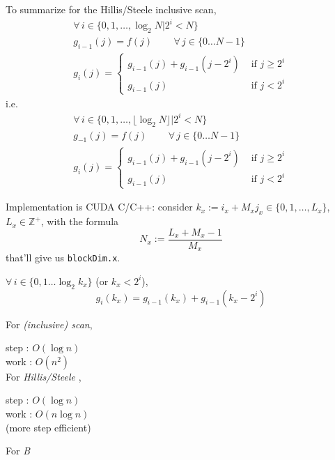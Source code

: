 \documentclass[10pt]{amsart}
\begin{document}
\begin{multicols*}{2}
To summarize for the Hillis/Steele inclusive scan,
\begin{equation}
  \boxed{ \begin{gathered}
      \forall \, i \in \lbrace 0 ,1 , \dots , \log_2{N} | 2^i < N \rbrace \\ 
      g_{i-1}(j) = f(j) \qquad \, \forall \, j \in \lbrace 0 \dots N-1 \rbrace \\
      g_i(j) = \begin{cases}
        g_{i-1}(j) + g_{i-1}(j-2^i) & \text{ if } j \geq 2^i \\
        g_{i-1}(j) & \text{ if } j < 2^i \end{cases}
      \end{gathered}
  }
  \end{equation}
i.e.
\begin{equation}
  \boxed{ \begin{gathered}
      \forall \, i \in \lbrace 0 ,1 , \dots , \lfloor \log_2{N} \rfloor | 2^i < N \rbrace \\ 
      g_{-1}(j) = f(j) \qquad \, \forall \, j \in \lbrace 0 \dots N-1 \rbrace \\
      g_i(j) = \begin{cases}
        g_{i-1}(j) + g_{i-1}(j-2^i) & \text{ if } j \geq 2^i \\
        g_{i-1}(j) & \text{ if } j < 2^i \end{cases}
      \end{gathered}
  }
  \end{equation}


Implementation is CUDA C/C++:  consider $k_x:= i_x + M_xj_x \in \lbrace 0,1, \dots , L_x\rbrace$, $L_x \in \mathbb{Z}^+$, with the formula
\[
N_x := \frac{L_x + M_x-1}{M_x}
\]
that'll give us \verb|blockDim.x|.

$\forall \, i \in \lbrace 0 ,1\dots \log_2{k_x} \rbrace$ (or $k_x <2^i$),
\[
g_i(k_x) = g_{i-1}(k_x) + g_{i-1}(k_x-2^i)  
\]


For \emph{(inclusive) scan},

step : $O(\log{ n } )$ \\
work : $O(n^2)$ \\

For \emph{ Hillis/Steele },

step : $O(\log{ n } )$ \\
work : $O(n \log{n} )$ \\

(more step efficient)

For \emph{B}


\end{multicols*}
\end{document}

